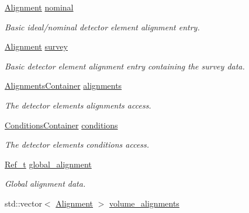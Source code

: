 \begin{DoxyCompactItemize}
\item 
\hyperlink{class_d_d4hep_1_1_geometry_1_1_det_element_object_aaf1bb49d0e1799f548f775b35e3cb590}{Alignment} \hyperlink{class_d_d4hep_1_1_geometry_1_1_det_element_object_a3020acb0795114c57c8d5bb536f310f4}{nominal}
\begin{DoxyCompactList}\small\item\em Basic ideal/nominal detector element alignment entry. \end{DoxyCompactList}\item 
\hyperlink{class_d_d4hep_1_1_geometry_1_1_det_element_object_aaf1bb49d0e1799f548f775b35e3cb590}{Alignment} \hyperlink{class_d_d4hep_1_1_geometry_1_1_det_element_object_ae01bd959a10eeb236ab0f21d7241a3a1}{survey}
\begin{DoxyCompactList}\small\item\em Basic detector element alignment entry containing the survey data. \end{DoxyCompactList}\item 
\hyperlink{class_d_d4hep_1_1_geometry_1_1_det_element_object_ab920e3c690de8d093cb556b0d3c87ce8}{Alignments\+Container} \hyperlink{class_d_d4hep_1_1_geometry_1_1_det_element_object_a400be16718ec486e44ad340f86946fcd}{alignments}
\begin{DoxyCompactList}\small\item\em The detector elements alignments access. \end{DoxyCompactList}\item 
\hyperlink{class_d_d4hep_1_1_geometry_1_1_det_element_object_a01728952c7dd2f2c102e2a1ae25b80ff}{Conditions\+Container} \hyperlink{class_d_d4hep_1_1_geometry_1_1_det_element_object_a80cf81ef1cd6f9f3d29865dee64ceaca}{conditions}
\begin{DoxyCompactList}\small\item\em The detector elements conditions access. \end{DoxyCompactList}\item 
\hyperlink{group___d_d4_h_e_p___g_e_o_m_e_t_r_y_ga40af83be6718bb8828a3d83dc7f8c930}{Ref\+\_\+t} \hyperlink{class_d_d4hep_1_1_geometry_1_1_det_element_object_a5f3e0ea44d06a48a4ba4525754f6ef03}{global\+\_\+alignment}
\begin{DoxyCompactList}\small\item\em Global alignment data. \end{DoxyCompactList}\item 
std\+::vector$<$ \hyperlink{class_d_d4hep_1_1_geometry_1_1_det_element_object_aaf1bb49d0e1799f548f775b35e3cb590}{Alignment} $>$ \hyperlink{class_d_d4hep_1_1_geometry_1_1_det_element_object_a549c814b4adf2d5897234ccd24186fb1}{volume\+\_\+alignments}

\end{DoxyCompactItemize}
